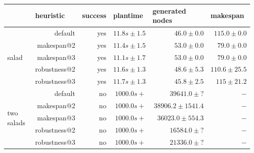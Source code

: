 \begin{table}[]
  \centering
  \begin{tabular}{p{1.5cm}rrrrr}
  \multicolumn{1}{l}{}         & \multicolumn{1}{l}{heuristic} & success & \multicolumn{1}{l}{plantime} & \multicolumn{1}{l}{generated nodes} & \multicolumn{1}{l}{makespan} \\ \hline \hline
  \multirow{5}{*}{salad}        & default                       & yes     & $11.8s\pm1.5 $              & $46.0\pm0.0$                         & $115.0 \pm0.0$               \\ 
                                & makespan@2                    & yes     & $11.4s\pm1.5 $              & $53.0\pm0.0$                         & $79.0  \pm0.0$               \\ 
                                & makespan@3                    & yes     & $11.1s\pm1.7 $              & $53.0\pm0.0$                         & $79.0  \pm0.0$               \\
                                & robustness@2                  & yes     & $11.6s\pm1.3 $              & $48.6\pm5.3$                         & $110.6 \pm25.5$               \\ 
                                & robustness@3                  & yes     & $11.7s\pm1.3 $              & $45.8\pm2.5$                         & $115 \pm21.2$               \\\hline
  \multirow{5}{*}{\parbox{1.2cm}{two salads}}   
                                & default                       & no      & $1000.0s+$                  & $39641.0\pm?$                        & $-     $                     \\
                                & makespan@2                    & no      & $1000.0s+$                  & $38906.2\pm1541.4$                   & $-     $                     \\
                                & makespan@3                    & no      & $1000.0s+$                  & $36023.0\pm554.3$                    & $-     $                     \\
                                & robustness@2                  & no      & $1000.0s+$                  & $16584.0\pm?$                        & $-     $                     \\ 
                                & robustness@3                  & no      & $1000.0s+$                  & $21336.0\pm?$                        & $-     $                     \\\hline

\end{tabular}
\end{table}
